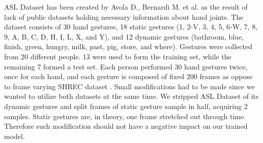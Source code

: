 ASL Dataset has been created by Avola D., Bernardi M. et al. \cite{avola} as the result of lack of public datasets holding necessary information about hand joints.
The dataset consists of 30 hand gestures, 18 static gestures (1, 2-V, 3, 4, 5, 6-W, 7, 8, 9, A, B, C, D, H, I, L, X, and Y), and 12 dynamic gestures (bathroom, blue, finish, green, hungry, milk,
past, pig, store, and where). Gestures were collected from 20 different people. 13 were used to form the training set, while the remaining 7 formed a test set. Each person performed 30 hand gestures twice, once for each hand, and each gesture is composed of fixed 200 frames as oppose to frame varying SHREC dataset \cite{avola}. Small modifications had to be made since we wanted to utilize both datasets at the same time. We stripped ASL Dataset of its dynamic gestures and split frames of static gesture sample in half, acquiring 2 samples. Static gestures are, in theory, one frame stretched out through time. Therefore such modification should not have a negative impact on our trained model.


